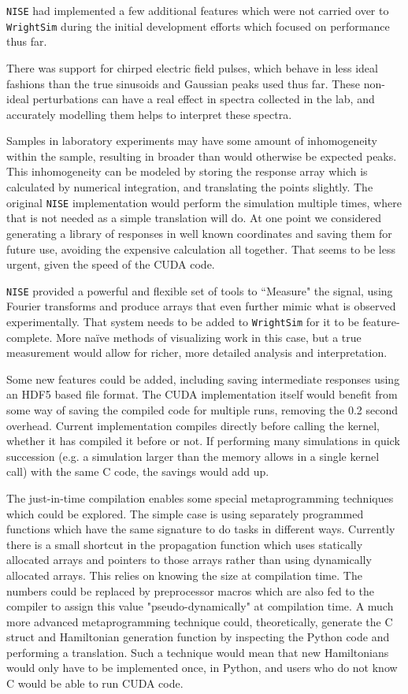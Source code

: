 \texttt{NISE} had implemented a few additional features which were not
carried over to \texttt{WrightSim} during the initial development
efforts which focused on performance thus far.

There was support for chirped electric field pulses, which behave in
less ideal fashions than the true sinusoids and Gaussian peaks used thus
far. These non-ideal perturbations can have a real effect in spectra
collected in the lab, and accurately modelling them helps to interpret
these spectra.

Samples in laboratory experiments may have some amount of inhomogeneity
within the sample, resulting in broader than would otherwise be expected
peaks. This inhomogeneity can be modeled by storing the response array
which is calculated by numerical integration, and translating the points
slightly. The original \texttt{NISE} implementation would perform the
simulation multiple times, where that is not needed as a simple
translation will do. At one point we considered generating a library of
responses in well known coordinates and saving them for future use,
avoiding the expensive calculation all together. That seems to be less
urgent, given the speed of the CUDA code.

\texttt{NISE} provided a powerful and flexible set of tools to
``Measure" the signal, using Fourier transforms and produce arrays that
even further mimic what is observed experimentally. That system needs to
be added to \texttt{WrightSim} for it to be feature-complete. More naïve
methods of visualizing work in this case, but a true measurement would
allow for richer, more detailed analysis and interpretation.

Some new features could be added, including saving intermediate
responses using an HDF5 based file format. The CUDA implementation
itself would benefit from some way of saving the compiled code for
multiple runs, removing the 0.2 second overhead. Current implementation
compiles directly before calling the kernel, whether it has compiled it
before or not. If performing many simulations in quick succession (e.g.
a simulation larger than the memory allows in a single kernel call) with
the same C code, the savings would add up.

The just-in-time compilation enables some special metaprogramming
techniques which could be explored. The simple case is using separately
programmed functions which have the same signature to do tasks in
different ways. Currently there is a small shortcut in the propagation
function which uses statically allocated arrays and pointers to those
arrays rather than using dynamically allocated arrays. This relies on
knowing the size at compilation time. The numbers could be replaced by
preprocessor macros which are also fed to the compiler to assign this
value "pseudo-dynamically" at compilation time. A much more advanced
metaprogramming technique could, theoretically, generate the C struct
and Hamiltonian generation function by inspecting the Python code and
performing a translation. Such a technique would mean that new
Hamiltonians would only have to be implemented once, in Python, and
users who do not know C would be able to run CUDA code.


